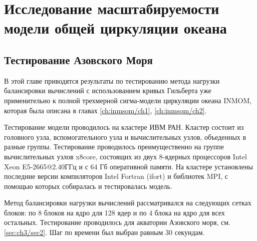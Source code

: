 \chapter{Исследование масштабируемости модели общей циркуляции океана}\label{ch:inmsom/ch3}

\section{Тестирование Азовского Моря}\label{sec:inmsom/ch3/sec1}

	В этой главе приводятся результаты по тестированию метода нагрузки балансировки вычислений  с использованием кривых Гильберта уже применительно к полной трехмерной сигма-модели циркуляции океана INMOM, которая была описана в главах \ref{ch:inmsom/ch1}, \ref{ch:inmsom/ch2}.
	
	Тестирование модели проводилось на кластере ИВМ РАН. Кластер состоит из головного узла, вспомогательного узла и вычислительных узлов,
	объеденных в разные группы. Тестирование проводилось преимущественно на группе вычислительных узлов x8core, состоящих из двух 8-ядерных процессоров Intel Xeon E5-2665@2.40ГГц
	и с 64 Гб оперативной памяти.
	На кластере установлены последние версии компиляторов Intel Fortran (ifort) и библиотек MPI, с помощью
	которых собиралась и тестировалась модель.
	
	Метод балансировки нагрузки вычислений рассматривался на следующих сетках блоков:
	по 8 блоков на ядро для 128 ядер и по 4 блока на ядро для всех остальных. 
	Тестирование проводилось для акватории Азовского моря, см. \ref{sec:ch3/sec2}. Шаг по времени был выбран равным 30 секундам.
	
	
